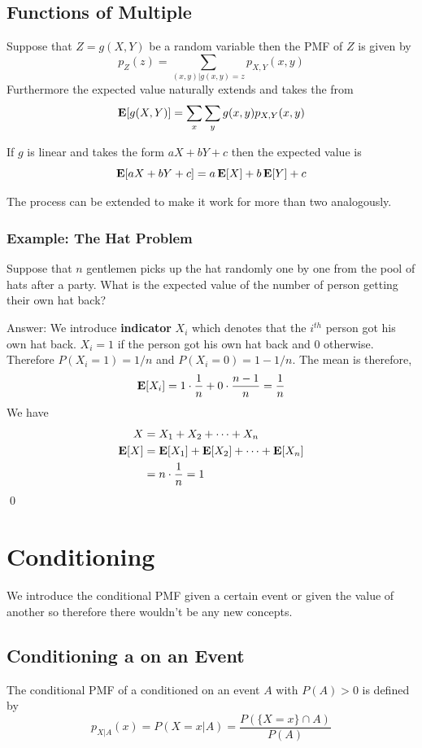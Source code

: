 \subsection{Functions of Multiple \RV}
Suppose that $Z=g(X, Y)$ be a random variable then the PMF of $Z$ is given by
\[p_Z(z)= \sum_{(x,y)|g(x,y)=z}p_{X,Y}(x,y)\]
Furthermore the expected value naturally extends and takes the from
\[\operatorname{\textbf{E}}[g(X,Y)] = \sum_x \sum_y g(x,y)p_{X,Y}(x,y)\]

If $g$ is linear and takes the form $aX+bY+c$ then the expected value is
\[\operatorname{\textbf{E}}[aX+bY+c]=a\operatorname{\textbf{E}}[X]+b\operatorname{\textbf{E}}[Y]+c\]

\begin{remark}
    The process can be extended to make it work for more than two \rv analogously.
\end{remark}

\subsubsection{Example: The Hat Problem}
Suppose that $n$ gentlemen picks up the hat randomly one by one from the pool of hats after a party. What is the expected value of the number of person getting their own hat back?

Answer: We introduce \textbf{indicator \rv} $X_i$ which denotes that the $i^{th}$ person got his own hat back. $X_i=1$ if the person got his own hat back and 0 otherwise. Therefore $P(X_i=1)=1/n$ and $P(X_i=0)=1-1/n$. The mean is therefore,
\[\operatorname{\textbf{E}}[X_i]=1 \cdot \frac{1}{n}+0 \cdot \frac{n-1}{n} = \frac{1}{n}\]
We have
\begin{align*}
    X &= X_1 + X_2 + \cdots + X_n \\
    \operatorname{\textbf{E}}[X] &= \operatorname{\textbf{E}}[X_1] + \operatorname{\textbf{E}}[X_2] + \cdots + \operatorname{\textbf{E}}[X_n] \\
         &= n \cdot \frac{1}{n} = 1
\end{align*} \qed

\section{Conditioning}
We introduce the conditional PMF given a certain event or given the value of another \rv so therefore there wouldn't be any new concepts.

\subsection{Conditioning a \RV on an Event}
The conditional PMF of a \rv conditioned on an event $A$ with $P(A)>0$ is defined by
\[p_{X|A}(x)=P(X=x|A)=\frac{P(\{X=x\}\cap A)}{P(A)}\]

